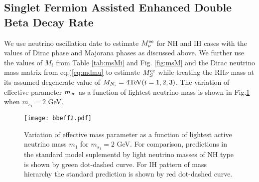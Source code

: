 \documentclass[a4paper,11pt]{article}
\begin{document}
\subsection{Singlet Fermion Assisted Enhanced Double Beta Decay Rate} 
We use neutrino oscillation date to estimate $M_{\nu}^{\rm ee}$ for NH and IH cases
with the values of Dirac phase and Majorana phases as discussed above. We further use the values of $M_i$ from Table \ref{tab:msMi} and Fig. \ref{fig:msM} and the Dirac neutrino mass matrix from eq.(\ref{eq:mdmu} to estimate $M_S^{\rm ee}$ 
while treating the RH$\nu$ mass at its assumed degenerate value of $M_{N_i}=4 {\rm TeV} (i=1,2,3)$. 
The variation of effective parameter $m_{\rm ee}$ as a function of
lightest neutrino mass is shown in Fig.\ref{fig:eff2} when $m_{s_1}=2$ GeV.
\begin{figure}[htbp]
 \texttt{[image: bbeff2.pdf]}
 \caption{Variation of effective mass parameter as a function of
   lightest active neutrino mass $m_1$ for $m_{s_1}=2$ GeV. For
   comparison, predictions in the standard model suplementd by light neutrino masses
   of NH type is shown by green dot-dashed curve. For IH pattern of
   mass hierarchy the standard prediction is shown by red dot-dashed
   curve.}   
\label{fig:eff2}
\end{figure}
\end{document}
